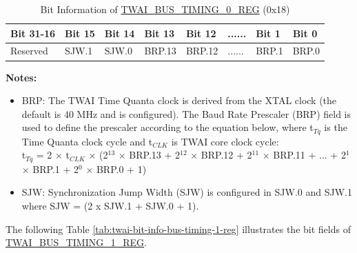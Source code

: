 \documentclass[main\_\_EN.tex]{subfiles}
\begin{document}
\begin{longtable}[c]{|p{2cm}|p{1.5cm}|p{1.5cm}|p{1.5cm}|p{1.5cm}|p{1.5cm}|p{1.5cm}|p{1.5cm}|}
\caption{Bit Information of \hyperref[regdesc:TWAIBUSTIMING0REG]{TWAI\_BUS\_TIMING\_0\_REG} (0x18)}
\label{tab:twai-bit-info-bus-timing-0-reg}\\\hline
\rowcolor{lightgray}
  \textbf{Bit 31-16} & \textbf{Bit 15} & \textbf{Bit 14} & \textbf{Bit 13} & \textbf{Bit 12} & \textbf{......} & \textbf{Bit 1} & \textbf{Bit 0}\\\hline 
  Reserved& SJW.1 & SJW.0 & BRP.13 & BRP.12 & ...... & BRP.1 & BRP.0\\\hline
\end{longtable}
\vspace{-1.5em}
{\bfseries Notes:}\\
\begin{itemize}
    \item BRP: The TWAI Time Quanta clock is derived from the XTAL clock (the default is 40 MHz and is configured). The Baud Rate Prescaler (BRP) field is used to define the prescaler according to the equation below, where t$_{Tq}$ is the Time Quanta clock cycle and t$_{CLK}$ is TWAI core clock cycle:\\

t$_{Tq}$ = 2 × t$_{CLK}$ × (2$^{13}$ × BRP.13 + 2$^{12}$ × BRP.12 + 2$^{11}$ × BRP.11 + ... + 2$^1$ × BRP.1 + 2$^0$ × BRP.0 + 1)
    \item SJW: Synchronization Jump Width (SJW) is configured in SJW.0 and SJW.1 where SJW = (2 x SJW.1 + SJW.0 + 1).
\end{itemize}

The following Table \ref{tab:twai-bit-info-bus-timing-1-reg} illustrates the bit fields of \hyperref[regdesc:TWAIBUSTIMING1REG]{TWAI\_BUS\_TIMING\_1\_REG}.
\end{document}
